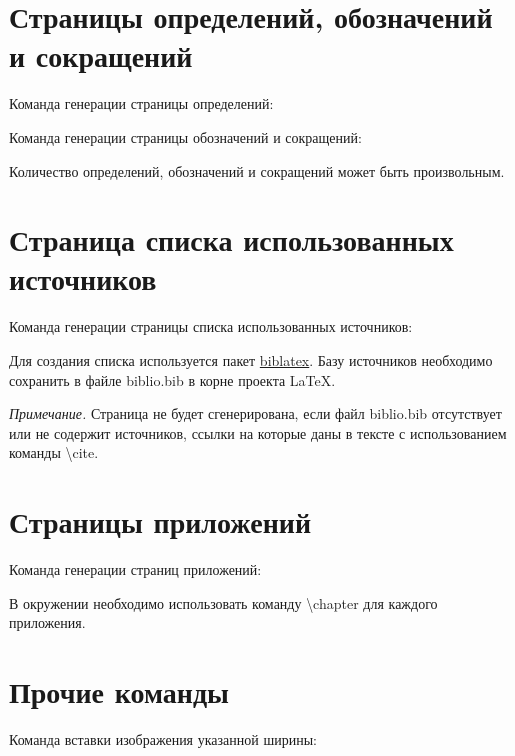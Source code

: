 \documentclass{bmstu}
\begin{document}
\section{Страницы определений, обозначений и сокращений}
Команда генерации страницы определений:

Команда генерации страницы обозначений и сокращений:

Количество определений, обозначений и сокращений может быть произвольным.

\section{Страница списка использованных источников}
Команда генерации страницы списка использованных источников:

Для создания списка используется пакет \href{https://www.ctan.org/pkg/biblatex}{biblatex}. Базу источников необходимо сохранить в файле {\ttfamily biblio.bib} в корне проекта \LaTeX.

\textit{Примечание.} Страница не будет сгенерирована, если файл {\ttfamily biblio.bib} отсутствует или не содержит источников, ссылки на которые даны в тексте с использованием команды {\ttfamily \textbackslash cite}.

\section{Страницы приложений}

Команда генерации страниц приложений:

В окружении необходимо использовать команду {\ttfamily \textbackslash chapter} для каждого приложения.

\section{Прочие команды}

Команда вставки изображения указанной ширины:
\end{document}
